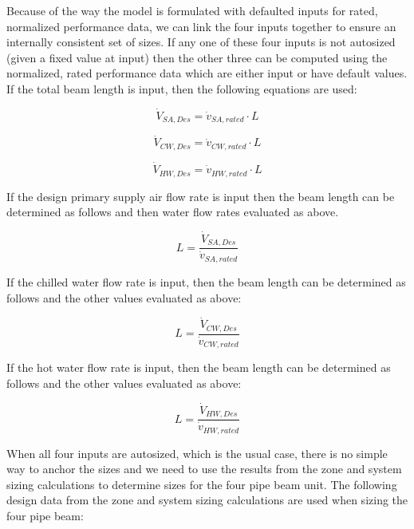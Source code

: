 Because of the way the model is formulated with defaulted inputs for rated, normalized performance data, we can link the four inputs together to ensure an internally consistent set of sizes. If any one of these four inputs is not autosized (given a fixed value at input) then the other three can be computed using the normalized, rated performance data which are either input or have default values. If the total beam length is input, then the following equations are used:

\begin{equation}
  {\dot V_{SA,Des}} = {{\dot v_{SA,rated}} \cdot {L}}
\end{equation}

\begin{equation}
  {\dot V_{CW,Des}} = {{\dot v_{CW,rated}} \cdot {L}}
\end{equation} 
  
\begin{equation}
  {\dot V_{HW,Des}} = {{\dot v_{HW,rated}} \cdot {L}}
\end{equation}

If the design primary supply air flow rate is input then the beam length can be determined as follows and then water flow rates evaluated as above.

\begin{equation}
{L} = {\frac{{\dot V_{SA,Des}}}{{\dot v_{SA,rated}}}  }
\end{equation}

If the chilled water flow rate is input, then the beam length can be determined as follows and the other values evaluated as above:

\begin{equation}
{L} = {\frac{{\dot V_{CW,Des}}}{{\dot v_{CW,rated}}}  }
\end{equation}

If the hot water flow rate is input, then the beam length can be determined as follows and the other values evaluated as above:

\begin{equation}
{L} = {\frac{{\dot V_{HW,Des}}}{{\dot v_{HW,rated}}}  }
\end{equation}

When all four inputs are autosized, which is the usual case, there is no simple way to anchor the sizes and we need to use the results from the zone and system sizing calculations to determine sizes for the four pipe beam unit. The following design data from the zone and system sizing calculations are used when sizing the four pipe beam:

